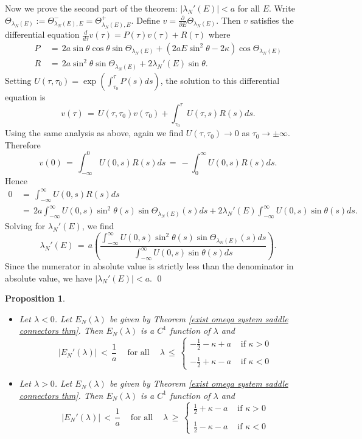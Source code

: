 \documentclass[11 pt]{article}
\newtheorem{prop}[thm]{Proposition}%
\renewcommand\l{\lambda}
\renewcommand\({\left(}
\renewcommand\){\right)}
\newcommand\<{\langle}
\renewcommand\>{\rangle}
\renewcommand\l{\lambda}
\newcommand\8{\infty}
\newcommand{\pd}{\partial}
\begin{document}
Now we prove the second part of the theorem: $|\l_N'(E)| < a$ for all $E$. Write $\Theta_{\l_N(E)} := \Theta^-_{\l_N(E),E} = \Theta^+_{\l_N(E),E}$. Define $v = \frac{\pd }{\pd E}\Theta_{\l_N(E)}$. Then $v$ satisfies the differential equation $\frac{d}{d\tau}v(\tau) = P(\tau)v(\tau) + R(\tau)$ where
\begin{align*}
P \,&=\, 2a \sin \theta \cos \theta \sin \Theta_{\l_N(E)} + (2aE \sin^2\theta -2\kappa) \cos\Theta_{\l_N(E)}
\\
R \,&=\, 2a\sin^2\theta\sin\Theta_{\l_N(E)} + 2 \l_N'(E)\sin \theta.
\end{align*}
Setting $U(\tau,\tau_0) = \exp(\int_{\tau_0}^\tau P(s)ds)$, the solution to this differential equation is 
\[
v(\tau) \,=\, U(\tau,\tau_0)v(\tau_0) + \int_{\tau_0}^\tau U(\tau,s)R(s)ds. 
\]
Using the same analysis as above, again we find $U(\tau,\tau_0) \to 0$ as $\tau_0 \to \pm \infty$. Therefore 
\[
v(0) \,=\, \int_{-\infty}^0U(0,s)R(s)ds \,=\, -\int_0^\infty U(0,s)R(s)ds. 
\]
Hence
\begin{align*}
0 \,&=\, \int_{-\infty}^\infty U(0,s)R(s)ds 
\\
&=\, 2a \int_{-\infty}^\infty U(0,s)\sin^2\theta(s)\sin\Theta_{\l_N(E)}(s)ds + 2\l_N'(E)\int_{-\infty}^\infty U(0,s)\sin \theta(s)ds. 
\end{align*}
Solving for $\l_N'(E)$, we find
\[
\l_N'(E) \,=\, a\left(\frac{\int_{-\infty}^\infty U(0,s)\sin^2\theta(s)\sin \Theta_{\l_N(E)}(s)ds }{\int_{-\infty}^\infty U(0,s)\sin\theta(s)ds }\right).
\]
Since the numerator in absolute value is strictly less than the denominator in absolute value, we have $|\l_N'(E)| < a$. 
\qed


\medskip
\medskip

\begin{prop}\label{E c1 prop}\:$\phantom{nix}$
\begin{itemize}
\item[$\bullet$] Let $\l < 0$. Let $E_N(\l)$ be given by Theorem  \emph{\ref{exist omega system saddle connectors thm}}. Then $E_N(\l)$ is a $C^1$ function of $\l$ and 
\[
|E_N'(\l)| \,<\, \frac{1}{a} \:\:\:\: \text{ for all } \:\:\:\: \l \,\leq\, \left\{
  \begin{array}{ll}
      -\frac{1}{2} - \kappa + a  & \text{ if } \kappa > 0   \\\\
      -\frac{1}{2} + \kappa -a & \text{ if } \kappa < 0    
\end{array} 
\right. \]


\item[$\bullet$] Let $\l > 0$. Let $E_N(\l)$ be given by Theorem  \emph{\ref{exist omega system saddle connectors thm}}. Then $E_N(\l)$ is a $C^1$ function of $\l$ and 
\[
|E_N'(\l)| \,<\, \frac{1}{a} \:\:\:\: \text{ for all } \:\:\:\: \l \,\geq\, \left\{
  \begin{array}{ll}
      \frac{1}{2} + \kappa - a  & \text{ if } \kappa > 0   \\\\
      \frac{1}{2} - \kappa -a & \text{ if } \kappa < 0    
\end{array} 
\right.\]
\end{itemize}
\end{prop}
\end{document}

